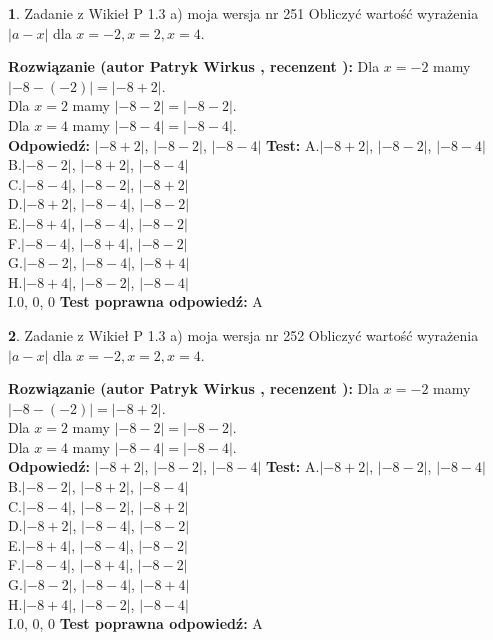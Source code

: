 \documentclass[12pt, a4paper]{article}
\theoremstyle{definition} %
\newtheorem{zad}{}
\newcommand{\zadStart}[1]{\begin{zad}#1\newline}
\newcommand{\zadStop}{\end{zad}}
\newcommand{\rozwStart}[2]{\noindent \textbf{Rozwiązanie (autor #1 , recenzent #2): }\newline}
\newcommand{\rozwStop}{\newline}
\newcommand{\odpStart}{\noindent \textbf{Odpowiedź:}\newline}
\newcommand{\odpStop}{\newline}
\newcommand{\testStart}{\noindent \textbf{Test:}\newline}
\newcommand{\testStop}{\newline}
\newcommand{\kluczStart}{\noindent \textbf{Test poprawna odpowiedź:}\newline}
\newcommand{\kluczStop}{\newline}
\begin{document}
\zadStart{Zadanie z Wikieł P 1.3 a) moja wersja nr 251}
Obliczyć wartość wyrażenia $|a - x|$ dla $x=-2,x=2,x=4$.
\zadStop
\rozwStart{Patryk Wirkus}{}
Dla $x = -2$ mamy $|-8 - (-2)| = |-8 + 2|$.\\
Dla $x = 2$ mamy $|-8 - 2| = |-8 - 2|$.\\
Dla $x = 4$ mamy $|-8 - 4| = |-8 - 4|$.\\
\rozwStop
\odpStart
$|-8 + 2|$, $|-8 - 2|$, $|-8 - 4|$
\odpStop
\testStart
A.$|-8 + 2|$, $|-8 - 2|$, $|-8 - 4|$\\
B.$|-8 - 2|$, $|-8 + 2|$, $|-8 - 4|$\\
C.$|-8 - 4|$, $|-8 - 2|$, $|-8 + 2|$\\
D.$|-8 + 2|$, $|-8 - 4|$, $|-8 - 2|$\\
E.$|-8 + 4|$, $|-8 - 4|$, $|-8 - 2|$\\
F.$|-8 - 4|$, $|-8 + 4|$, $|-8 - 2|$\\
G.$|-8 - 2|$, $|-8 - 4|$, $|-8 + 4|$\\
H.$|-8 + 4|$, $|-8 - 2|$, $|-8 - 4|$\\
I.$0$, $0$, $0$
\testStop
\kluczStart
A
\kluczStop



\zadStart{Zadanie z Wikieł P 1.3 a) moja wersja nr 252}
Obliczyć wartość wyrażenia $|a - x|$ dla $x=-2,x=2,x=4$.
\zadStop
\rozwStart{Patryk Wirkus}{}
Dla $x = -2$ mamy $|-8 - (-2)| = |-8 + 2|$.\\
Dla $x = 2$ mamy $|-8 - 2| = |-8 - 2|$.\\
Dla $x = 4$ mamy $|-8 - 4| = |-8 - 4|$.\\
\rozwStop
\odpStart
$|-8 + 2|$, $|-8 - 2|$, $|-8 - 4|$
\odpStop
\testStart
A.$|-8 + 2|$, $|-8 - 2|$, $|-8 - 4|$\\
B.$|-8 - 2|$, $|-8 + 2|$, $|-8 - 4|$\\
C.$|-8 - 4|$, $|-8 - 2|$, $|-8 + 2|$\\
D.$|-8 + 2|$, $|-8 - 4|$, $|-8 - 2|$\\
E.$|-8 + 4|$, $|-8 - 4|$, $|-8 - 2|$\\
F.$|-8 - 4|$, $|-8 + 4|$, $|-8 - 2|$\\
G.$|-8 - 2|$, $|-8 - 4|$, $|-8 + 4|$\\
H.$|-8 + 4|$, $|-8 - 2|$, $|-8 - 4|$\\
I.$0$, $0$, $0$
\testStop
\kluczStart
A
\kluczStop
\end{document}
